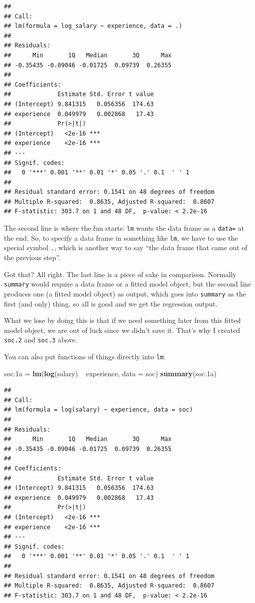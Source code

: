 \documentclass[]{tufte-book}
\newenvironment{Shaded}{}{}
\newcommand{\DataTypeTok}[1]{\textcolor[rgb]{0.56,0.13,0.00}{#1}}
\newcommand{\FloatTok}[1]{\textcolor[rgb]{0.25,0.63,0.44}{#1}}
\newcommand{\KeywordTok}[1]{\textcolor[rgb]{0.00,0.44,0.13}{\textbf{#1}}}
\newcommand{\NormalTok}[1]{#1}
\newcommand{\OperatorTok}[1]{\textcolor[rgb]{0.40,0.40,0.40}{#1}}
\newcommand{\StringTok}[1]{\textcolor[rgb]{0.25,0.44,0.63}{#1}}
\theoremstyle{definition}
\theoremstyle{definition}
\theoremstyle{definition}
\theoremstyle{remark}
\begin{document}
\begin{verbatim}
## 
## Call:
## lm(formula = log_salary ~ experience, data = .)
## 
## Residuals:
##      Min       1Q   Median       3Q      Max 
## -0.35435 -0.09046 -0.01725  0.09739  0.26355 
## 
## Coefficients:
##             Estimate Std. Error t value
## (Intercept) 9.841315   0.056356  174.63
## experience  0.049979   0.002868   17.43
##             Pr(>|t|)    
## (Intercept)   <2e-16 ***
## experience    <2e-16 ***
## ---
## Signif. codes:  
##   0 '***' 0.001 '**' 0.01 '*' 0.05 '.' 0.1  ' ' 1
## 
## Residual standard error: 0.1541 on 48 degrees of freedom
## Multiple R-squared:  0.8635, Adjusted R-squared:  0.8607 
## F-statistic: 303.7 on 1 and 48 DF,  p-value: < 2.2e-16
\end{verbatim}

The second line is where the fun starts: \texttt{lm} wants the data
frame as a \texttt{data=} at the end. So, to specify a data frame in
something like \texttt{lm}, we have to use the special symbol
\texttt{.}, which is another way to say ``the data frame that came out
of the previous step''.

Got that? All right. The last line is a piece of cake in comparison.
Normally \texttt{summary} would require a data frame or a fitted model
object, but the second line produces one (a fitted model object) as
output, which goes into \texttt{summary} as the first (and only) thing,
so all is good and we get the regression output.

What we lose by doing this is that if we need something later from this
fitted model object, we are out of luck since we didn't save it. That's
why I created \texttt{soc.2} and \texttt{soc.3} above.

You can also put functions of things directly into \texttt{lm}:

\begin{Shaded}
\begin{Highlighting}[]
\NormalTok{soc}\FloatTok{.1}\NormalTok{a =}\StringTok{ }\KeywordTok{lm}\NormalTok{(}\KeywordTok{log}\NormalTok{(salary) }\OperatorTok{~}\StringTok{ }\NormalTok{experience, }\DataTypeTok{data =}\NormalTok{ soc)}
\KeywordTok{summary}\NormalTok{(soc}\FloatTok{.1}\NormalTok{a)}
\end{Highlighting}
\end{Shaded}

\begin{verbatim}
## 
## Call:
## lm(formula = log(salary) ~ experience, data = soc)
## 
## Residuals:
##      Min       1Q   Median       3Q      Max 
## -0.35435 -0.09046 -0.01725  0.09739  0.26355 
## 
## Coefficients:
##             Estimate Std. Error t value
## (Intercept) 9.841315   0.056356  174.63
## experience  0.049979   0.002868   17.43
##             Pr(>|t|)    
## (Intercept)   <2e-16 ***
## experience    <2e-16 ***
## ---
## Signif. codes:  
##   0 '***' 0.001 '**' 0.01 '*' 0.05 '.' 0.1  ' ' 1
## 
## Residual standard error: 0.1541 on 48 degrees of freedom
## Multiple R-squared:  0.8635, Adjusted R-squared:  0.8607 
## F-statistic: 303.7 on 1 and 48 DF,  p-value: < 2.2e-16
\end{verbatim}
\end{document}
